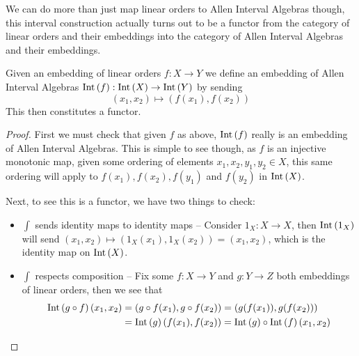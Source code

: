\documentclass[../main.tex]{subfiles}
\begin{document}
We can do more than just map linear orders to Allen Interval Algebras though, this interval
construction actually turns out to be a functor from the category of linear orders and their
embeddings into the category of Allen Interval Algebras and their embeddings.


\begin{prop}
  Given an embedding of linear orders $f : X \to Y$ we define an embedding of Allen Interval
  Algebras $\text{Int}\left(f\right) : \text{Int}\left(X\right) \to \text{Int}\left(Y\right)$ by sending
  \begin{equation*}
    (x_1, x_2) \mapsto (f(x_1), f(x_2))
  \end{equation*}
  This then constitutes a functor.
\end{prop}
\begin{proof}
  First we must check that given $f$ as above, $\text{Int}\left(f\right)$ really is an embedding of Allen Interval
  Algebras. This is simple to see though, as $f$ is an injective monotonic map, given some ordering
  of elements $x_1,x_2,y_1,y_2 \in X$, this same ordering will apply to $f(x_1),f(x_2),f(y_1)$ and
  $f(y_2)$ in $\text{Int}\left(X\right)$.
  
  Next, to see this is a functor, we have two things to check:
  \begin{itemize}
    \item $\int$ sends identity maps to identity maps -- Consider $1_X : X \to X$, then $\text{Int}\left(1_X\right)$
      will send $(x_1,x_2) \mapsto (1_X(x_1), 1_X(x_2)) = (x_1,x_2)$, which is the identity map
      on $\text{Int}\left(X\right)$.
    \item $\int$ respects composition -- Fix some $f : X \to Y$ and $g : Y \to Z$ both embeddings of
      linear orders, then we see that
      \begin{align*}
        \text{Int}\left(g \circ f\right)(x_1, x_2) &= (g \circ f(x_1), g \circ f(x_2))
                                = (g(f(x_1)), g(f(x_2))) \\
                                &= \text{Int}\left(g\right)(f(x_1), f(x_2)) = \text{Int}\left(g\right)\circ\text{Int}\left(f\right)(x_1,x_2)
      \end{align*}
  \end{itemize}
\end{proof}



\end{document}
